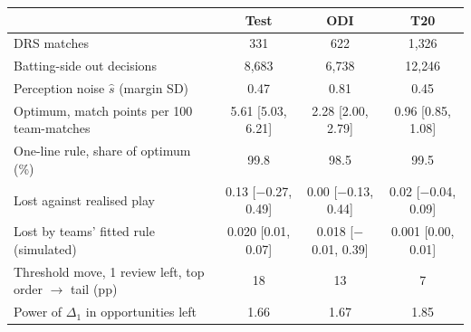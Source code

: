 \begin{tabular}{lccc}
\toprule
 & Test & ODI & T20 \\
\midrule
DRS matches & 331 & 622 & 1{,}326 \\
Batting-side out decisions & 8{,}683 & 6{,}738 & 12{,}246 \\
Perception noise $\hat s$ (margin SD) & 0.47 & 0.81 & 0.45 \\
Optimum, match points per 100 team-matches & 5.61 [5.03, 6.21] & 2.28 [2.00, 2.79] & 0.96 [0.85, 1.08] \\
One-line rule, share of optimum (\%) & 99.8 & 98.5 & 99.5 \\
Lost against realised play & 0.13 [\ensuremath{-}0.27, 0.49] & 0.00 [\ensuremath{-}0.13, 0.44] & 0.02 [\ensuremath{-}0.04, 0.09] \\
Lost by teams' fitted rule (simulated) & 0.020 [0.01, 0.07] & 0.018 [\ensuremath{-}0.01, 0.39] & 0.001 [0.00, 0.01] \\
Threshold move, 1 review left, top order $\to$ tail (pp) & 18 & 13 & 7 \\
Power of $\Delta_1$ in opportunities left & 1.66 & 1.67 & 1.85 \\
\bottomrule
\end{tabular}
